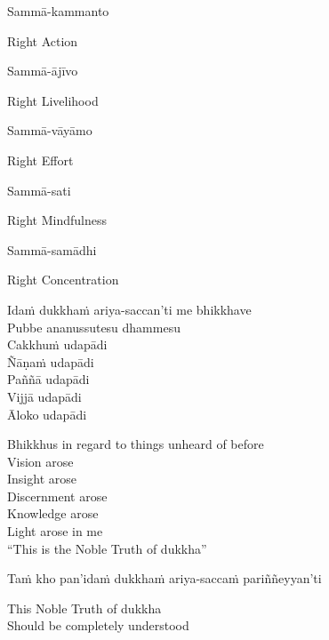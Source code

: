 Sammā-kammanto

\begin{cprenglish}
  Right Action
\end{cprenglish}

Sammā-ājīvo

\begin{cprenglish}
  Right Livelihood
\end{cprenglish}

Sammā-vāyāmo

\begin{cprenglish}
  Right Effort
\end{cprenglish}

Sammā-sati

\begin{cprenglish}
  Right Mindfulness
\end{cprenglish}

Sammā-samādhi

\begin{cprenglish}
  Right Concentration
\end{cprenglish}

Idaṁ dukkhaṁ ariya-saccan’ti me bhikkhave\\
Pubbe ananussutesu dhammesu\\
Cakkhuṁ udapādi\\
Ñāṇaṁ udapādi\\
Paññā udapādi\\
Vijjā udapādi\\
Āloko udapādi

\begin{cprenglish}
  Bhikkhus in regard to things unheard of before\\
  Vision arose\\
  Insight arose\\
  Discernment arose\\
  Knowledge arose\\
  Light arose in me\\
  “This is the Noble Truth of dukkha”
\end{cprenglish}

Taṁ kho pan’idaṁ dukkhaṁ ariya-saccaṁ pariññeyyan’ti

\begin{cprenglish}
  This Noble Truth of dukkha\\
  Should be completely understood
\end{cprenglish}

